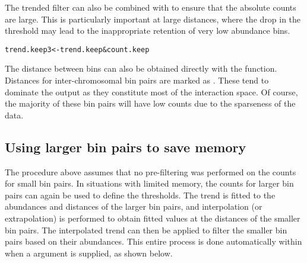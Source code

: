 \documentclass{report}\usepackage[]{graphicx}\usepackage[usenames,dvipsnames]{color}
\newcommand{\hlnum}[1]{\textcolor[rgb]{0.816,0.125,0.439}{#1}}%
\newcommand{\hlopt}[1]{\textcolor[rgb]{0,0,0}{#1}}%
\newcommand{\hlstd}[1]{\textcolor[rgb]{0.251,0.251,0.251}{#1}}%
\newcommand{\hlkwb}[1]{\textcolor[rgb]{0,0,0}{#1}}%
\newcommand{\hlkwd}[1]{\textcolor[rgb]{0.878,0.439,0.125}{#1}}%
\newenvironment{knitrout}{}{} %
\begin{document}
\begin{knitrout}
\color{fgcolor}
\end{knitrout}

The trended filter can also be combined with  to ensure that the absolute counts are large.
This is particularly important at large distances, where the drop in the threshold may lead to the inappropriate retention of very low abundance bins.

\begin{knitrout}
\color{fgcolor}\begin{kframe}
\begin{alltt}
\hlstd{trend.keep3} \hlkwb{<-} \hlstd{trend.keep} \hlopt{&} \hlstd{count.keep}
\end{alltt}
\end{kframe}
\end{knitrout}

The distance between bins can also be obtained directly with the  function.
Distances for inter-chromosomal bin pairs are marked as .
These tend to dominate the output as they constitute most of the interaction space.
Of course, the majority of these bin pairs will have low counts due to the sparseness of the data.

\subsection{Using larger bin pairs to save memory}
The procedure above assumes that no pre-filtering was performed on the counts for small bin pairs.
In situations with limited memory, the counts for larger bin pairs can again be used to define the thresholds.
The trend is fitted to the abundances and distances of the larger bin pairs, and interpolation (or extrapolation) is performed to obtain fitted values at the distances of the smaller bin pairs.
The interpolated trend can then be applied to filter the smaller bin pairs based on their abundances.
This entire process is done automatically within  when a  argument is supplied, as shown below.
\end{document}
